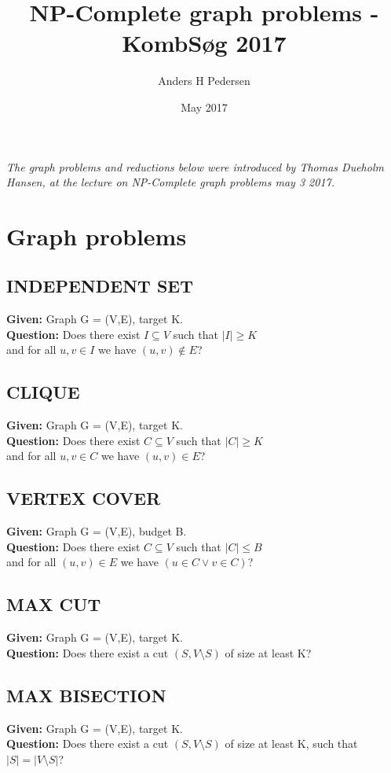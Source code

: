 \documentclass{article}
\title{NP-Complete graph problems - KombSøg 2017}
\author{Anders H Pedersen }
\date{May 2017}
\begin{document}
\maketitle

\begin{center}
\textit{The graph problems and reductions below were introduced by Thomas Dueholm Hansen, at the lecture on NP-Complete graph problems may 3 2017.}
\end{center}

\section{Graph problems}
\subsection{INDEPENDENT SET}
\textbf{Given:} Graph G = (V,E), target K. \\
\textbf{Question:} Does there exist $I \subseteq V$ such that $|I| \geq K$\\ and for all $u,v\in I$ we have $(u,v) \notin E$? 
\subsection{CLIQUE}
\textbf{Given:} Graph G = (V,E), target K. \\
\textbf{Question:} Does there exist $C \subseteq V$ such that $|C| \geq K$\\ and for all $u,v\in C$ we have $(u,v) \in E$?
\subsection{VERTEX COVER}
\textbf{Given:} Graph G = (V,E), budget B. \\
\textbf{Question:} Does there exist $C \subseteq V$ such that $|C| \leq B$\\
and for all $(u,v) \in E$ we have $(u \in C \lor v \in C)$?
\subsection{MAX CUT}
\textbf{Given:} Graph G = (V,E), target K. \\
\textbf{Question:} Does there exist a cut  $(S,V\setminus S)$ of size at least K?\\
\subsection{MAX BISECTION}
\textbf{Given:} Graph G = (V,E), target K.\\
\textbf{Question:} Does there exist a cut  $(S,V\setminus S)$ of size at least K, such that $|S| =  |V \setminus S|$?
\end{document}
